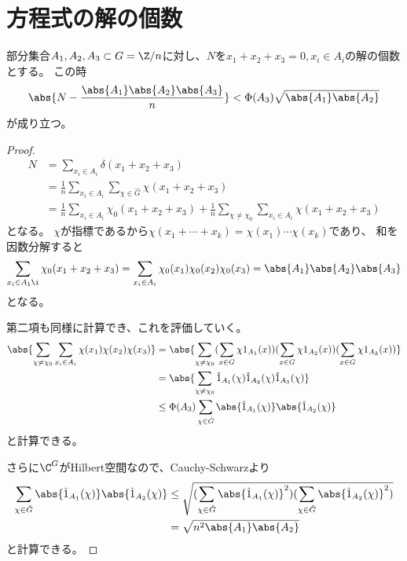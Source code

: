 \documentclass{jsarticle}
\begin{document}
\section{方程式の解の個数}
\begin{thm}
部分集合$A_1, A_2, A_3 \subset G=\Z/n$に対し、$N$を$x_1+x_2+x_3=0, x_i\in A_i$の解の個数とする。
この時
\begin{align*}
\abs{N-\frac{\abs{A_1}\abs{A_2}\abs{A_3}}{n}}<\Phi(A_3)\sqrt{\abs{A_1}\abs{A_2}}
\end{align*}
が成り立つ。
\end{thm}
\begin{proof}
\begin{align*}
N&=\sum_{x_i\in A_i}\delta(x_1+x_2+x_3)\\
&=\frac{1}{n}\sum_{x_i\in A_i}\sum_{\chi\in\hat{G}}\chi(x_1+x_2+x_3)\\
&=\frac{1}{n}\sum_{x_i\in A_i}\chi_0(x_1+x_2+x_3)+\frac{1}{n}\sum_{\chi\neq\chi_0}\sum_{x_i\in A_i}\chi(x_1+x_2+x_3)
\end{align*}
となる。
$\chi$が指標であるから$\chi(x_1+\cdots+x_k)=\chi(x_1)\cdots\chi(x_k)$であり、
和を因数分解すると
\begin{align*}
\sum_{x_i\in A_1\i}\chi_0(x_1+x_2+x_3)=\sum_{x_i\in A_i}\chi_0(x_1)\chi_0(x_2)\chi_0(x_3)=\abs{A_1}\abs{A_2}\abs{A_3}
\end{align*}
となる。

第二項も同様に計算でき、これを評価していく。
\begin{align*}
\abs{\sum_{\chi\neq\chi_0}\sum_{x_i\in A_i}\chi(x_1)\chi(x_2)\chi(x_3)}&
=\abs{\sum_{\chi\neq\chi_0}(\sum_{x\in G}\chi1_{A_1}(x))(\sum_{x\in G}\chi1_{A_2}(x))(\sum_{x\in G}\chi1_{A_3}(x))}\\
&=\abs{\sum_{\chi\neq\chi_0}\hat{1}_{A_1}(\chi)\hat{1}_{A_2}(\chi)\hat{1}_{A_3}(\chi)}\\
&\leq\Phi(A_3)\sum_{\chi\in\hat{G}}\abs{\hat{1}_{A_1}(\chi)}\abs{\hat{1}_{A_2}(\chi)}\\
\end{align*}
と計算できる。

さらに$\C^G$がHilbert空間なので、Cauchy-Schwarzより
\begin{align*}
\sum_{\chi\in\hat{G}}\abs{\hat{1}_{A_1}(\chi)}\abs{\hat{1}_{A_2}(\chi)}
&\leq\sqrt{(\sum_{\chi\in\hat{G}}\abs{\hat{1}_{A_1}(\chi)}^2)(\sum_{\chi\in\hat{G}}\abs{\hat{1}_{A_2}(\chi)}^2)}\\
&=\sqrt{n^2\abs{A_1}\abs{A_2}}
\end{align*}
と計算できる。
\end{proof}
\end{document}
